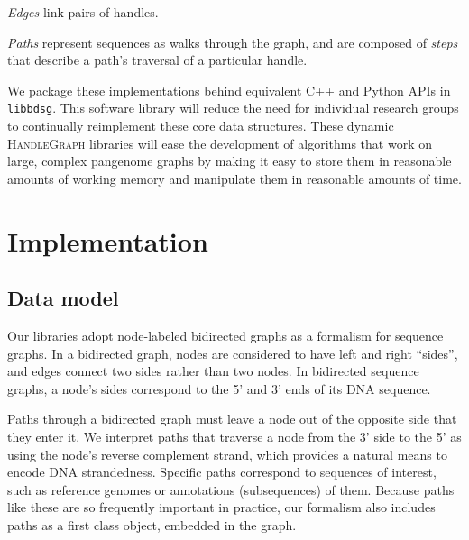 \documentclass{article}
\begin{document}
\emph{Edges} link pairs of handles. %

\emph{Paths} represent sequences as walks through the graph, and are composed of \emph{steps} that describe a path's traversal of a particular handle.

We package these implementations behind equivalent C++ and Python APIs in \texttt{libbdsg}.
This software library will reduce the need for individual research groups to continually reimplement these core data structures.
These dynamic \textsc{HandleGraph} libraries will ease the development of algorithms that work on large, complex pangenome graphs by making it easy to store them in reasonable amounts of working memory and manipulate them in reasonable amounts of time.




\section{Implementation}

\subsection{Data model}

Our libraries adopt node-labeled bidirected graphs as a formalism for sequence graphs.
In a bidirected graph, nodes are considered to have left and right ``sides'', and edges connect two sides rather than two nodes.
In bidirected sequence graphs, a node's sides correspond to the 5' and 3' ends of its DNA sequence. 

Paths through a bidirected graph must leave a node out of the opposite side that they enter it.
We interpret paths that traverse a node from the 3' side to the 5' as using the node's reverse complement strand, which provides a natural means to encode DNA strandedness.
Specific paths correspond to sequences of interest, such as reference genomes or annotations (subsequences) of them.
Because paths like these are so frequently important in practice, our formalism also includes paths as a first class object, embedded in the graph.
\end{document}
